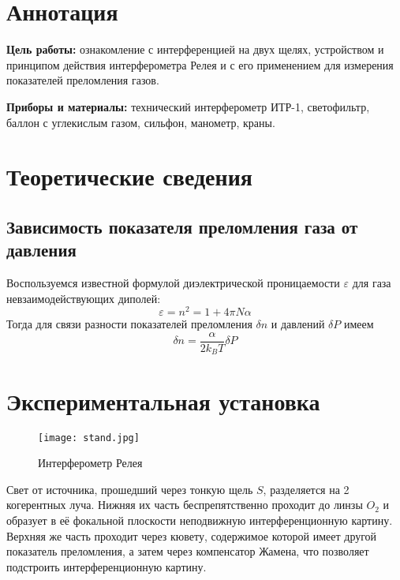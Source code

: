 






\section{Аннотация}

\textbf{Цель работы:} ознакомление с интерференцией на двух щелях,
устройством и принципом действия интерферометра Релея и с его
применением для измерения показателей преломления газов.

\textbf{Приборы и материалы:} технический интерферометр ИТР-1, светофильтр, баллон с углекислым газом, сильфон, манометр, краны.

\section{Теоретические сведения}

\subsection{Зависимость показателя преломления газа от давления}
Воспользуемся известной формулой диэлектрической проницаемости $\varepsilon$ для газа невзаимодействующих диполей:
\begin{equation*}
	\varepsilon = n^2 = 1 + 4\pi N\alpha
\end{equation*}
Тогда для связи разности показателей преломления $\delta n$ и давлений $\delta P$ имеем
\begin{equation*}
	\delta n = \frac{\alpha}{2k_BT}\delta P
\end{equation*} 
	
\section{Экспериментальная установка}
\begin{figure}[H]
	\centering
	\texttt{[image: stand.jpg]}
	\caption{Интерферометр Релея}
\end{figure}

Свет от источника, прошедший через тонкую щель $S$, разделяется на 2 когерентных луча. Нижняя их часть беспрепятственно проходит до линзы $O_2$ и образует в её фокальной плоскости неподвижную интерференционную картину. Верхняя же часть проходит через кювету, содержимое которой имеет другой показатель преломления, а затем через компенсатор Жамена, что позволяет подстроить интерференционную картину.

